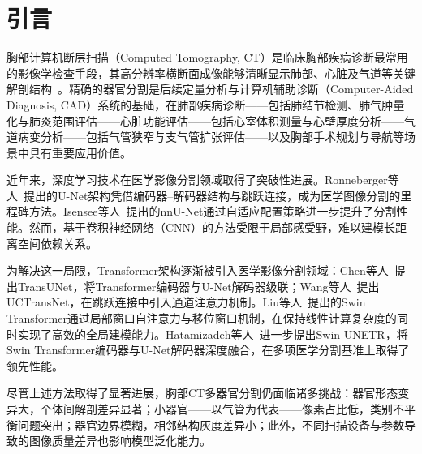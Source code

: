 \documentclass[12pt, a4paper]{article}
\begin{document}
\clearpage

\pagestyle{fancy}
\fancyhf{}
\fancyfoot[C]{\thepage}
\renewcommand{\headrulewidth}{0.3pt}
\renewcommand{\footrulewidth}{0pt}

\setcounter{page}{1}

\tableofcontents
\clearpage

\section{引言}
\label{sec:intro}

胸部计算机断层扫描（Computed Tomography, CT）是临床胸部疾病诊断最常用的影像学检查手段，其高分辨率横断面成像能够清晰显示肺部、心脏及气道等关键解剖结构~\cite{hatamizadeh2022swin}。精确的器官分割是后续定量分析与计算机辅助诊断（Computer-Aided Diagnosis, CAD）系统的基础，在肺部疾病诊断——包括肺结节检测、肺气肿量化与肺炎范围评估——心脏功能评估——包括心室体积测量与心壁厚度分析——气道病变分析——包括气管狭窄与支气管扩张评估——以及胸部手术规划与导航等场景中具有重要应用价值。

近年来，深度学习技术在医学影像分割领域取得了突破性进展。Ronneberger等人~\cite{ronneberger2015unet}提出的U-Net架构凭借编码器--解码器结构与跳跃连接，成为医学图像分割的里程碑方法。Isensee等人~\cite{isensee2021nnunet}提出的nnU-Net通过自适应配置策略进一步提升了分割性能。然而，基于卷积神经网络（CNN）的方法受限于局部感受野，难以建模长距离空间依赖关系。

为解决这一局限，Transformer架构逐渐被引入医学影像分割领域：Chen等人~\cite{chen2021transunet}提出TransUNet，将Transformer编码器与U-Net解码器级联；Wang等人~\cite{wang2022uctransnet}提出UCTransNet，在跳跃连接中引入通道注意力机制。Liu等人~\cite{liu2021swin}提出的Swin Transformer通过局部窗口自注意力与移位窗口机制，在保持线性计算复杂度的同时实现了高效的全局建模能力。Hatamizadeh等人~\cite{hatamizadeh2022swin}进一步提出Swin-UNETR，将Swin Transformer编码器与U-Net解码器深度融合，在多项医学分割基准上取得了领先性能。

尽管上述方法取得了显著进展，胸部CT多器官分割仍面临诸多挑战：器官形态变异大，个体间解剖差异显著；小器官——以气管为代表——像素占比低，类别不平衡问题突出；器官边界模糊，相邻结构灰度差异小；此外，不同扫描设备与参数导致的图像质量差异也影响模型泛化能力。
\end{document}
